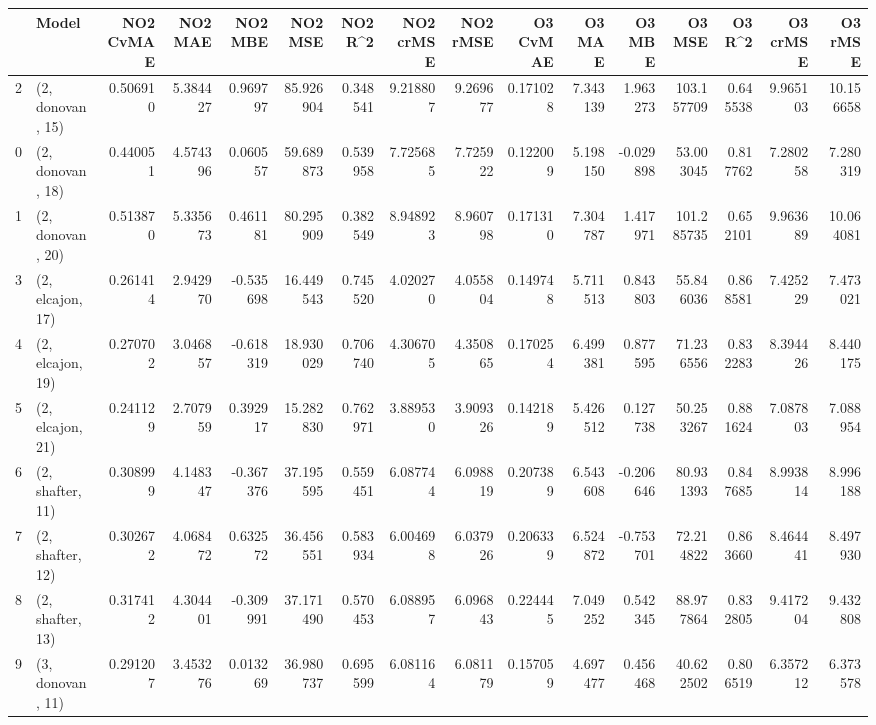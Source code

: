 \begin{tabular}{llrrrrrrrrrrrrrr}
\toprule
{} &             Model &  NO2 CvMAE &   NO2 MAE &   NO2 MBE &    NO2 MSE &   NO2 R\textasciicircum2 &  NO2 crMSE &  NO2 rMSE &  O3 CvMAE &    O3 MAE &    O3 MBE &      O3 MSE &    O3 R\textasciicircum2 &   O3 crMSE &    O3 rMSE \\
\midrule
2  &  (2, donovan, 15) &   0.506910 &  5.384427 &  0.969797 &  85.926904 &  0.348541 &   9.218807 &  9.269677 &  0.171028 &  7.343139 &  1.963273 &  103.157709 &  0.645538 &   9.965103 &  10.156658 \\
0  &  (2, donovan, 18) &   0.440051 &  4.574396 &  0.060557 &  59.689873 &  0.539958 &   7.725685 &  7.725922 &  0.122009 &  5.198150 & -0.029898 &   53.003045 &  0.817762 &   7.280258 &   7.280319 \\
1  &  (2, donovan, 20) &   0.513870 &  5.335673 &  0.461181 &  80.295909 &  0.382549 &   8.948923 &  8.960798 &  0.171310 &  7.304787 &  1.417971 &  101.285735 &  0.652101 &   9.963689 &  10.064081 \\
3  &  (2, elcajon, 17) &   0.261414 &  2.942970 & -0.535698 &  16.449543 &  0.745520 &   4.020270 &  4.055804 &  0.149748 &  5.711513 &  0.843803 &   55.846036 &  0.868581 &   7.425229 &   7.473021 \\
4  &  (2, elcajon, 19) &   0.270702 &  3.046857 & -0.618319 &  18.930029 &  0.706740 &   4.306705 &  4.350865 &  0.170254 &  6.499381 &  0.877595 &   71.236556 &  0.832283 &   8.394426 &   8.440175 \\
5  &  (2, elcajon, 21) &   0.241129 &  2.707959 &  0.392917 &  15.282830 &  0.762971 &   3.889530 &  3.909326 &  0.142189 &  5.426512 &  0.127738 &   50.253267 &  0.881624 &   7.087803 &   7.088954 \\
6  &  (2, shafter, 11) &   0.308999 &  4.148347 & -0.367376 &  37.195595 &  0.559451 &   6.087744 &  6.098819 &  0.207389 &  6.543608 & -0.206646 &   80.931393 &  0.847685 &   8.993814 &   8.996188 \\
7  &  (2, shafter, 12) &   0.302672 &  4.068472 &  0.632572 &  36.456551 &  0.583934 &   6.004698 &  6.037926 &  0.206339 &  6.524872 & -0.753701 &   72.214822 &  0.863660 &   8.464441 &   8.497930 \\
8  &  (2, shafter, 13) &   0.317412 &  4.304401 & -0.309991 &  37.171490 &  0.570453 &   6.088957 &  6.096843 &  0.224445 &  7.049252 &  0.542345 &   88.977864 &  0.832805 &   9.417204 &   9.432808 \\
9  &  (3, donovan, 11) &   0.291207 &  3.453276 &  0.013269 &  36.980737 &  0.695599 &   6.081164 &  6.081179 &  0.157059 &  4.697477 &  0.456468 &   40.622502 &  0.806519 &   6.357212 &   6.373578 \\

\end{tabular}
